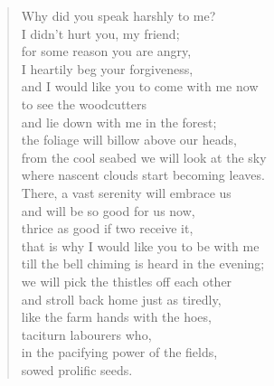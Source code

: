 \documentclass[11pt]{extbook}
\newcommand*{\centeredornament}{\centerline{\pgfornament[width=6cm]{88}}}
\begin{document}
\newpage


\vspace*{-15mm}
\centeredornament



\begin{verse}
  Why did you speak harshly to me? \\
  I didn't hurt you, my friend; \\
  for some reason you are angry, \\
  I heartily beg your forgiveness, \\
  and I would like you to come with me now \\
  to see the woodcutters \\
  and lie down with me in the forest; \\
  the foliage will billow above our heads, \\
  from the cool seabed we will look at the sky \\
  where nascent clouds start becoming leaves. \\
  There, a vast serenity will embrace us \\
  and will be so good for us now, \\
  thrice as good if two receive it, \\
  that is why I would like you to be with me \\
  till the bell chiming is heard in the evening; \\
  we will pick the thistles off each other \\
  and stroll back home just as tiredly, \\
  like the farm hands with the hoes, \\
  taciturn labourers who, \\
  in the pacifying power of the fields, \\
  sowed prolific seeds.
\end{verse}

\newpage

\vspace*{-15mm}
\centeredornament


\end{document}
